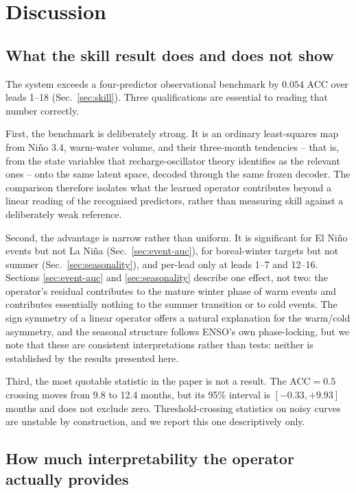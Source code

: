 \section{Discussion}
\label{sec:discussion}

\subsection{What the skill result does and does not show}

The system exceeds a four-predictor observational benchmark by $0.054$ ACC over leads 1--18
(Sec.~\ref{sec:skill}). Three qualifications are essential to reading that number
correctly.

First, the benchmark is deliberately strong. It is an ordinary least-squares map from Ni\~no
3.4, warm-water volume, and their three-month tendencies -- that is, from the state variables
that recharge-oscillator theory identifies as the relevant ones
\citep{Jin1997} -- onto the same latent space, decoded through the same
frozen decoder. The comparison therefore isolates what the learned operator contributes beyond
a linear reading of the recognised predictors, rather than measuring skill against a
deliberately weak reference.

Second, the advantage is narrow rather than uniform. It is significant for El Ni\~no events
but not La Ni\~na (Sec.~\ref{sec:event-auc}), for boreal-winter targets but not summer
(Sec.~\ref{sec:seasonality}), and per-lead only at leads 1--7 and 12--16. Sections
\ref{sec:event-auc} and \ref{sec:seasonality} describe one effect, not two: the operator's
residual contributes to the mature winter phase of warm events and contributes essentially
nothing to the summer transition or to cold events. The sign symmetry of a linear operator
offers a natural explanation for the warm/cold asymmetry, and the seasonal structure follows
ENSO's own phase-locking, but we note that these are consistent interpretations rather than
tests: neither is established by the results presented here.

Third, the most quotable statistic in the paper is not a result. The ACC$=0.5$ crossing moves
from 9.8 to 12.4 months, but its 95\% interval is $[-0.33, +9.93]$ months and does not exclude
zero. Threshold-crossing statistics on noisy curves are unstable by construction, and we report
this one descriptively only.

\subsection{How much interpretability the operator actually provides}

